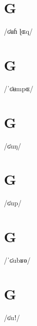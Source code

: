 \documentclass[10pt,a4paper,twoside]{book}
\begin{document}
\section*{G}

\begin{multicols}{3}
 {/ʛʉɦ ɭɶq/} {}
\end{multicols}

\section*{G}

\begin{multicols}{3}
 {/ˈʛʉmpɶ/} {}
\end{multicols}

\section*{G}

\begin{multicols}{3}
 {/ʛuŋ/} {}
\end{multicols}

\section*{G}

\begin{multicols}{3}
 {/ʛup/} {}
\end{multicols}

\section*{G}

\begin{multicols}{3}
 {/ˈʛubʁɵ/} {}
\end{multicols}

\section*{G}

\begin{multicols}{3}
 {/ʛuǃ/} {}
\end{multicols}
\end{document}
